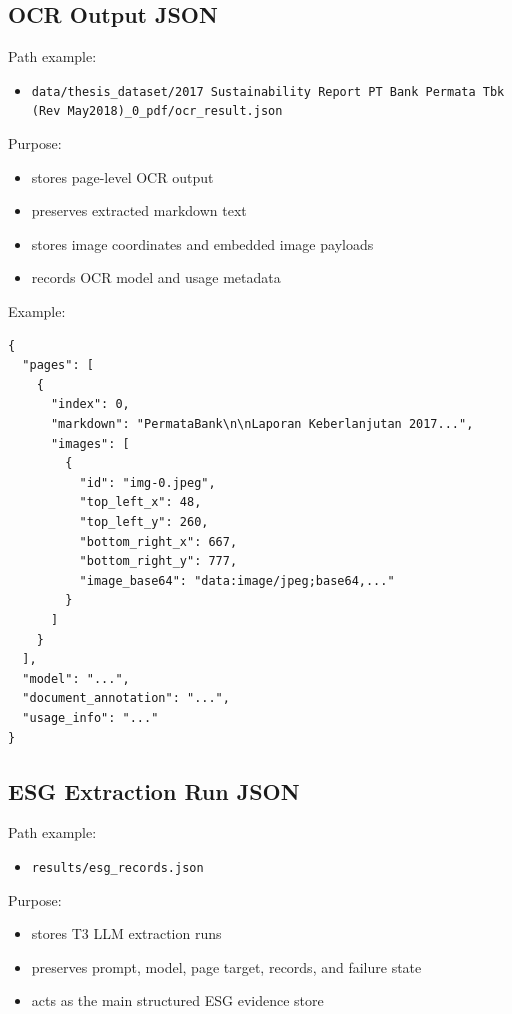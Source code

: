 \documentclass[english, online, cse, master]{dithesis}
\providecommand{\tightlist}{\setlength{\itemsep}{0pt}\setlength{\parskip}{0pt}}
\begin{document}
\subsection{OCR Output JSON}\label{ocr-output-json}

Path example:

\begin{itemize}
\tightlist
\item
  \texttt{data/thesis\_dataset/2017\ Sustainability\ Report\ PT\ Bank\ Permata\ Tbk\ (Rev\ May2018)\_0\_pdf/ocr\_result.json}
\end{itemize}

Purpose:

\begin{itemize}
\tightlist
\item
  stores page-level OCR output
\item
  preserves extracted markdown text
\item
  stores image coordinates and embedded image payloads
\item
  records OCR model and usage metadata
\end{itemize}

Example:

\begin{verbatim}
{
  "pages": [
    {
      "index": 0,
      "markdown": "PermataBank\n\nLaporan Keberlanjutan 2017...",
      "images": [
        {
          "id": "img-0.jpeg",
          "top_left_x": 48,
          "top_left_y": 260,
          "bottom_right_x": 667,
          "bottom_right_y": 777,
          "image_base64": "data:image/jpeg;base64,..."
        }
      ]
    }
  ],
  "model": "...",
  "document_annotation": "...",
  "usage_info": "..."
}
\end{verbatim}

\subsection{ESG Extraction Run JSON}\label{esg-extraction-run-json}

Path example:

\begin{itemize}
\tightlist
\item
  \texttt{results/esg\_records.json}
\end{itemize}

Purpose:

\begin{itemize}
\tightlist
\item
  stores T3 LLM extraction runs
\item
  preserves prompt, model, page target, records, and failure state
\item
  acts as the main structured ESG evidence store
\end{itemize}
\end{document}

